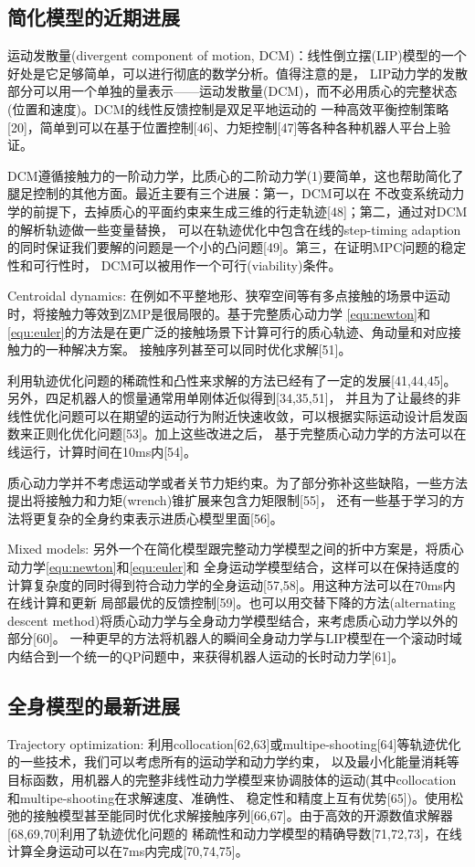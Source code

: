 \subsection{简化模型的近期进展}
运动发散量(divergent component of motion, DCM)：线性倒立摆(LIP)模型的一个好处是它足够简单，可以进行彻底的数学分析。值得注意的是，
LIP动力学的发散部分可以用一个单独的量表示——运动发散量(DCM)，而不必用质心的完整状态(位置和速度)。DCM的线性反馈控制是双足平地运动的
一种高效平衡控制策略[20]，简单到可以在基于位置控制[46]、力矩控制[47]等各种各种机器人平台上验证。

DCM遵循接触力的一阶动力学，比质心的二阶动力学(1)要简单，这也帮助简化了腿足控制的其他方面。最近主要有三个进展：第一，DCM可以在
不改变系统动力学的前提下，去掉质心的平面约束来生成三维的行走轨迹[48]；第二，通过对DCM的解析轨迹做一些变量替换，
可以在轨迹优化中包含在线的step-timing adaption的同时保证我们要解的问题是一个小的凸问题[49]。第三，在证明MPC问题的稳定性和可行性时，
DCM可以被用作一个可行(viability)条件。

Centroidal dynamics: 在例如不平整地形、狭窄空间等有多点接触的场景中运动时，将接触力等效到ZMP是很局限的。基于完整质心动力学
\autoref{equ:newton}和\autoref{equ:euler}的方法是在更广泛的接触场景下计算可行的质心轨迹、角动量和对应接触力的一种解决方案。
接触序列甚至可以同时优化求解[51]。

利用轨迹优化问题的稀疏性和凸性来求解的方法已经有了一定的发展[41,44,45]。另外，四足机器人的惯量通常用单刚体近似得到[34,35,51]，
并且为了让最终的非线性优化问题可以在期望的运动行为附近快速收敛，可以根据实际运动设计启发函数来正则化优化问题[53]。加上这些改进之后，
基于完整质心动力学的方法可以在线运行，计算时间在10ms内[54]。

质心动力学并不考虑运动学或者关节力矩约束。为了部分弥补这些缺陷，一些方法提出将接触力和力矩(wrench)锥扩展来包含力矩限制[55]，
还有一些基于学习的方法将更复杂的全身约束表示进质心模型里面[56]。

Mixed models: 另外一个在简化模型跟完整动力学模型之间的折中方案是，将质心动力学\autoref{equ:newton}和\autoref{equ:euler}和
全身运动学模型结合，这样可以在保持适度的计算复杂度的同时得到符合动力学的全身运动[57,58]。用这种方法可以在70ms内在线计算和更新
局部最优的反馈控制[59]。也可以用交替下降的方法(alternating descent method)将质心动力学与全身动力学模型结合，来考虑质心动力学以外的部分[60]。
一种更早的方法将机器人的瞬间全身动力学与LIP模型在一个滚动时域内结合到一个统一的QP问题中，来获得机器人运动的长时动力学[61]。

\subsection{全身模型的最新进展}
Trajectory optimization: 利用collocation[62,63]或multipe-shooting[64]等轨迹优化的一些技术，我们可以考虑所有的运动学和动力学约束，
以及最小化能量消耗等目标函数，用机器人的完整非线性动力学模型来协调肢体的运动(其中collocation和multipe-shooting在求解速度、准确性、
稳定性和精度上互有优势[65])。使用松弛的接触模型甚至能同时优化求解接触序列[66,67]。由于高效的开源数值求解器[68,69,70]利用了轨迹优化问题的
稀疏性和动力学模型的精确导数[71,72,73]，在线计算全身运动可以在7ms内完成[70,74,75]。

